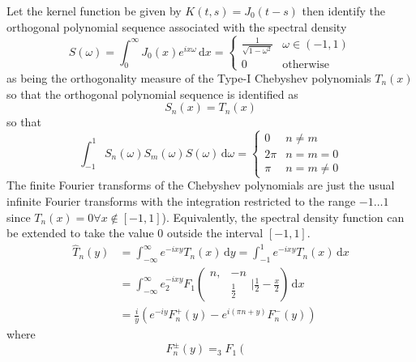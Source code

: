 \documentclass{article}
\begin{document}
\begin{example}
Let the kernel function be given by $K (t, s) = J_0 (t - s)$ then identify
the orthogonal polynomial sequence associated with the spectral density
\begin{equation}
S (\omega) = \int_0^{\infty} J_0 (x) e^{ix \omega} \,
\mathrm{d} x = \left\{ \begin{array}{ll}
\frac{1}{\sqrt{1 - \omega^2}} & \omega \in (- 1, 1)\\
0 & \text{otherwise}
\end{array} \right.
\end{equation}
as being the orthogonality measure of the Type-I Chebyshev polynomials $T_n
(x)$ so that the orthogonal polynomial sequence is identified as
\begin{equation}
S_n (x) = T_n (x)
\end{equation}
so that
\begin{equation}
\int_{- 1}^1 S_n (\omega) S_m (\omega) S (\omega) \,
\mathrm{d} \omega = \left\{ \begin{array}{ll}
0 & n \neq m\\
2 \pi & n = m = 0\\
\pi & n = m \neq 0
\end{array} \right.
\end{equation}
The finite Fourier transforms of the Chebyshev
polynomials are just the usual infinite
Fourier transforms with the integration restricted to the range $- 1 \ldots
1$ since $T_n (x) = 0 \forall x \notin [- 1, 1]$). Equivalently, the spectral
density function can be extended to take the value 0 outside the interval
$[- 1, 1]$.
\begin{equation}
\begin{array}{ll}
\hat{T}_n (y) & = \int_{- \infty}^{\infty} e^{- ix y} T_n (x) \, \mathrm{d}y = 
\int_{- 1}^1 e^{- ix y} T_n (x) \, \mathrm{d}x\\
& = \int_{- \infty}^{\infty} e^{- ix y} _2 F_1 \left( \begin{array}{cc}
n, & - n\\
& \frac{1}{2}
\end{array} | \frac{1}{2} - \frac{x}{2} \right) \, \mathrm{d}x\\
& = \frac{i}{y} (e^{- i y} F^+_n (y) - e^{i (\pi n + y)} F_n^- (y))
\end{array}
\end{equation}
where
\begin{equation}
F_n^{\pm} (y) =_3 F_1 \left( \begin{array}{ccc}

\end{array}
\end{equation}
\end{example}
\end{document}
